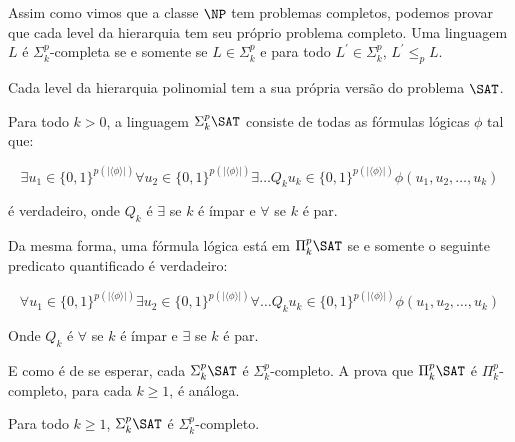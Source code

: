 Assim como vimos que a classe $\NP$ tem problemas completos, podemos provar que cada level da hierarquia tem seu próprio problema completo. Uma linguagem $L$ é $\Sigma_{k}^{p}$-completa se e somente se $L \in \Sigma_{k}^{p}$ e para todo $L^{\prime} \in \Sigma_{k}^{p}$, $L^{\prime} \leq_{p} L$.  

Cada level da hierarquia polinomial tem a sua própria versão do problema $\SAT$.

\begin{defi}

Para todo $k > 0$, a linguagem $\Sigma_{k}^{p}\SAT$ consiste de todas as fórmulas lógicas $\phi$ tal que:

\begin{equation*}
    \exists u_{1} \in \{0, 1\}^{p(\lvert \langle \phi \rangle \rvert)} \forall u_{2} \in \{0, 1\}^{p(\lvert \langle \phi \rangle \rvert)} \exists \dots Q_{k} u_{k} \in \{0, 1\}^{p(\lvert \langle \phi \rangle \rvert)} \phi(u_{1}, u_{2}, \dots, u_{k})
\end{equation*}

é verdadeiro, onde $Q_{k}$ é $\exists$ se $k$ é ímpar e $\forall$ se $k$ é par.

Da mesma forma, uma fórmula lógica está em $\Pi_{k}^{p}\SAT$ se e somente o seguinte predicato quantificado é verdadeiro:

\begin{equation*}
    \forall u_{1} \in \{0, 1\}^{p(\lvert \langle \phi \rangle \rvert)} \exists u_{2} \in \{0, 1\}^{p(\lvert \langle \phi \rangle \rvert)} \forall \dots Q_{k} u_{k} \in \{0, 1\}^{p(\lvert \langle \phi \rangle \rvert)} \phi(u_{1}, u_{2}, \dots, u_{k})
\end{equation*}

Onde $Q_{k}$ é $\forall$ se $k$ é ímpar e $\exists$ se $k$ é par.

\end{defi}

E como é de se esperar, cada $\Sigma_{k}^{p}\SAT$ é $\Sigma_{k}^{p}$-completo. A prova que $\Pi_{k}^{p}\SAT$ é $\Pi_{k}^{p}$-completo, para cada $k \geq 1$, é análoga.

\begin{teo}

Para todo $k \geq 1$, $\Sigma_{k}^{p}\SAT$ é $\Sigma_{k}^{p}$-completo.

\end{teo}

